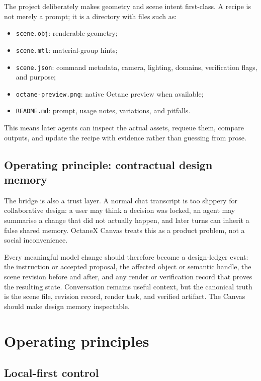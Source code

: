 \documentclass[11pt,a4paper]{article}
\begin{document}
The project deliberately makes geometry and scene intent first-class. A recipe is not merely a prompt; it is a directory with files such as:

\begin{itemize}[leftmargin=*]
  \item \texttt{scene.obj}: renderable geometry;
  \item \texttt{scene.mtl}: material-group hints;
  \item \texttt{scene.json}: command metadata, camera, lighting, domains, verification flags, and purpose;
  \item \texttt{octane-preview.png}: native Octane preview when available;
  \item \texttt{README.md}: prompt, usage notes, variations, and pitfalls.
\end{itemize}

This means later agents can inspect the actual assets, requeue them, compare outputs, and update the recipe with evidence rather than guessing from prose.

\subsection{Operating principle: contractual design memory}

The bridge is also a trust layer. A normal chat transcript is too slippery for
collaborative design: a user may think a decision was locked, an agent may
summarise a change that did not actually happen, and later turns can inherit a
false shared memory. OctaneX Canvas treats this as a product problem, not a
social inconvenience.

Every meaningful model change should therefore become a design-ledger event: the
instruction or accepted proposal, the affected object or semantic handle, the
scene revision before and after, and any render or verification record that
proves the resulting state. Conversation remains useful context, but the
canonical truth is the scene file, revision record, render task, and verified
artifact. The Canvas should make design memory inspectable.

\section{Operating principles}

\subsection{Local-first control}
\end{document}
